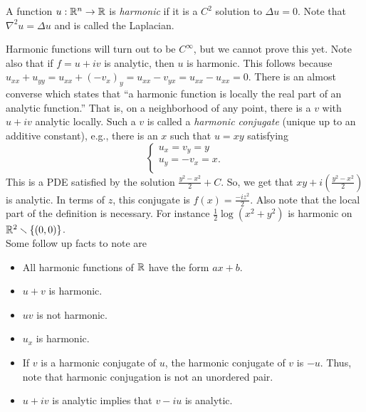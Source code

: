 \documentclass[11pt,leqno,oneside]{amsart}
\numberwithin{thm}{section}
\begin{document}
    \begin{defn}
        A function $u: {\mathbb R}^n \to {\mathbb R}$ is \emph{harmonic} if it is a $C^2$
        solution to $\Delta u = 0$. Note that $\nabla^2u = \Delta u$ and is
        called the Laplacian.
    \end{defn}
    Harmonic functions will turn out to be $C^\infty$, but we cannot prove this
    yet. Note also that if $f = u+iv$ is analytic, then $u$ is harmonic. This
    follows because $u_{xx}+u_{yy} = u_{xx}+(-v_x)_y = u_{xx}-v_{yx} =
    u_{xx}-u_{xx} = 0$. There is an almost converse which states that ``a
    harmonic function is locally the real part of an analytic function.'' That
    is, on a neighborhood of any point, there is a $v$ with $u+iv$ analytic locally.
    Such a $v$ is called a \emph{harmonic conjugate} (unique up to an additive
    constant), e.g., there is an $x$ such that $u=xy$ satisfying \[
        \begin{cases}
 u_x = v_y = y \\
 u_y = -v_x = x. \\
    \end{cases}
\]
This is a PDE satisfied by the solution $\frac{y^2-x^2}{2} + C$. So, we get
that $xy+i\left( \frac{y^2-x^2}{2} \right)$ is analytic. In terms of $z$, this
conjugate is $f(x) = \frac{-iz^2}{2}$. Also note that the local part of the
definition is necessary. For instance $\frac{1}{2} \log(x^2+y^2)$ is harmonic
on ${\mathbb R}^2 \smallsetminus \{(0,0)\}$. \\

Some follow up facts to note are
\begin{itemize}
    \item All harmonic functions of ${\mathbb R}$ have the form $ax+b$.
    \item $u+v$ is harmonic.
    \item $uv$ is not harmonic.
    \item $u_x$ is harmonic.
    \item If $v$ is a harmonic conjugate of $u$, the harmonic conjugate of $v$
       is $-u$. Thus, note that harmonic conjugation is not an unordered pair.
    \item $u+iv$ is analytic implies that $v-iu$ is analytic.
\end{itemize}
\end{document}
